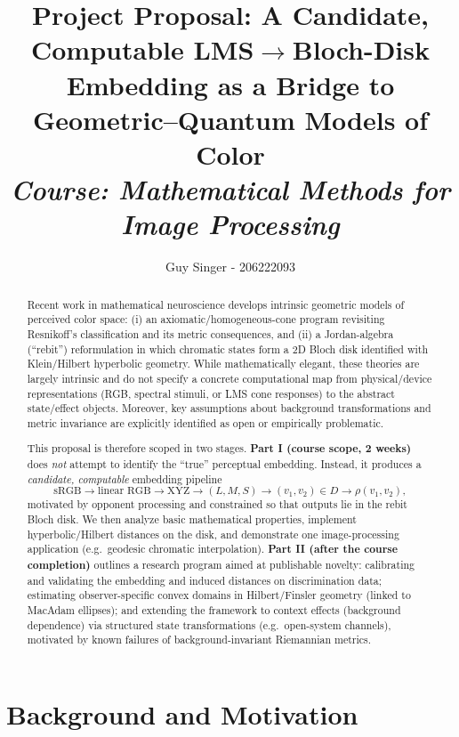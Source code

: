 \documentclass[11pt]{article}
\title{\vspace{-1.0em}
\textbf{Project Proposal: A Candidate, Computable LMS$\to$Bloch-Disk Embedding as a Bridge to Geometric--Quantum Models of Color}\\
\vspace{0.25em}
\small \textit{Course: Mathematical Methods for Image Processing}}
\author{
Guy Singer - 206222093}
\date{\underline{\hspace{4.2cm}}}
\begin{document}
\maketitle

\vspace{-0.5em}
\begin{abstract}
Recent work in mathematical neuroscience develops intrinsic geometric models of perceived color space:
(i) an axiomatic/homogeneous-cone program revisiting Resnikoff's classification and its metric consequences, and
(ii) a Jordan-algebra (``rebit'') reformulation in which chromatic states form a 2D Bloch disk identified with Klein/Hilbert hyperbolic geometry.
While mathematically elegant, these theories are largely intrinsic and do not specify a concrete computational map from physical/device representations (RGB, spectral stimuli, or LMS cone responses) to the abstract state/effect objects.
Moreover, key assumptions about background transformations and metric invariance are explicitly identified as open or empirically problematic.

This proposal is therefore scoped in two stages.
\textbf{Part I (course scope, 2 weeks)} does \emph{not} attempt to identify the ``true'' perceptual embedding.
Instead, it produces a \emph{candidate, computable} embedding pipeline
\[
\text{sRGB} \to \text{linear RGB} \to \text{XYZ} \to (L,M,S) \to (v_1,v_2)\in D \to \rho(v_1,v_2),
\]
motivated by opponent processing and constrained so that outputs lie in the rebit Bloch disk.
We then analyze basic mathematical properties, implement hyperbolic/Hilbert distances on the disk, and demonstrate one image-processing application (e.g.\ geodesic chromatic interpolation).
\textbf{Part II (after the course completion)} outlines a research program aimed at publishable novelty: calibrating and validating the embedding and induced distances on discrimination data; estimating observer-specific convex domains in Hilbert/Finsler geometry (linked to MacAdam ellipses); and extending the framework to context effects (background dependence) via structured state transformations (e.g.\ open-system channels), motivated by known failures of background-invariant Riemannian metrics.
\end{abstract}

\section{Background and Motivation}
\end{document}
